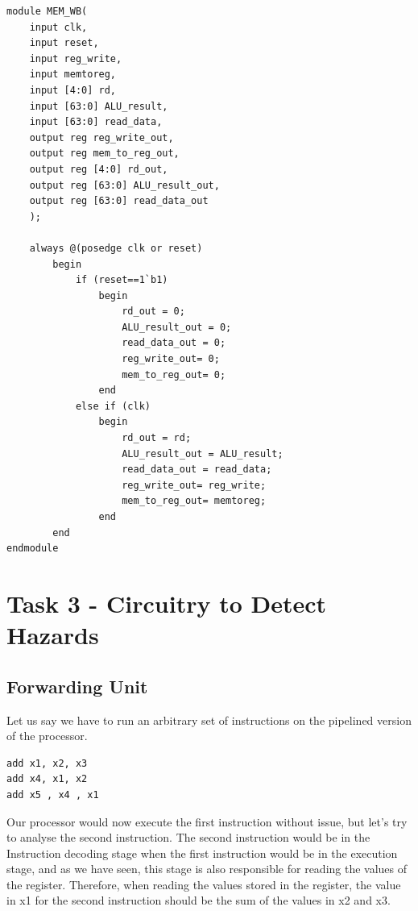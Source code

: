 \documentclass{article}
\begin{document}
\begin{lstlisting}[caption={MEM/WB Register}, captionpos=b, language=RISC-V]
module MEM_WB(
    input clk,
    input reset,
    input reg_write,
    input memtoreg,
    input [4:0] rd,
    input [63:0] ALU_result,
    input [63:0] read_data,
    output reg reg_write_out,
    output reg mem_to_reg_out,
    output reg [4:0] rd_out,
    output reg [63:0] ALU_result_out,
    output reg [63:0] read_data_out 
    );
       
    always @(posedge clk or reset)
        begin
            if (reset==1`b1)
                begin
                    rd_out = 0;
                    ALU_result_out = 0;
                    read_data_out = 0;
                    reg_write_out= 0;
                    mem_to_reg_out= 0;            	
                end
            else if (clk)
                begin
                    rd_out = rd;
                    ALU_result_out = ALU_result;
                    read_data_out = read_data;
                    reg_write_out= reg_write;
                    mem_to_reg_out= memtoreg;            	
                end
        end        
endmodule
\end{lstlisting}

\section{Task 3 - Circuitry to Detect Hazards}

\subsection{Forwarding Unit}
Let us say we have to run an arbitrary set of instructions on the pipelined version of the processor. 

\begin{lstlisting}[caption={Arbitrary Set of instructions}, captionpos=b, language=RISC-V]
add x1, x2, x3
add x4, x1, x2
add x5 , x4 , x1
\end{lstlisting}

Our processor would now execute the first instruction without issue, but let's try to analyse the second instruction. The second instruction would be in the Instruction decoding stage when the first instruction would be in the execution stage, and as we have seen, this stage is also responsible for reading the values of the register. Therefore, when reading the values stored in the register, the value in x1 for the second instruction should be the sum of the values in x2 and x3. 
\end{document}
